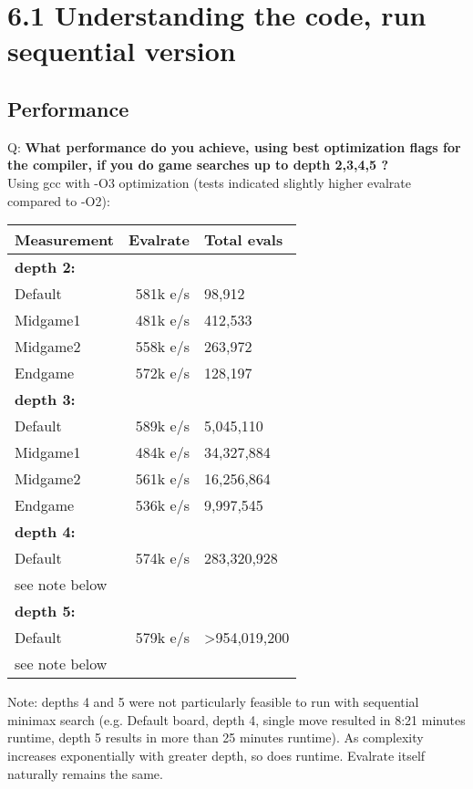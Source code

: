 \section*{6.1 Understanding the code, run sequential version}
\subsection*{Performance}
Q: \textbf{What performance do you achieve, using best optimization flags for the compiler, if you do game searches up to depth 2,3,4,5 ?} \\
Using gcc with -O3 optimization (tests indicated slightly higher evalrate compared to -O2): 
\begin{center}

  \begin{tabular} {|l|r|l|}
    \hline
    \textbf{Measurement} & \textbf{Evalrate} & \textbf{Total evals} \\ \hline
    \textbf{depth 2:} &  &  \\ \hline
    Default & 581k e/s & 98,912 \\ \hline
    Midgame1 & 481k e/s & 412,533 \\ \hline
    Midgame2 & 558k e/s & 263,972 \\ \hline
    Endgame & 572k e/s & 128,197 \\ \hline
    \textbf{depth 3:} &  &  \\ \hline
    Default & 589k e/s & 5,045,110 \\ \hline
    Midgame1 & 484k e/s & 34,327,884 \\ \hline
    Midgame2 & 561k e/s & 16,256,864 \\ \hline
    Endgame & 536k e/s & 9,997,545 \\ \hline
    \textbf{depth 4:} &  &  \\ \hline
    Default & 574k e/s & 283,320,928 \\ \hline
    see note below &  &  \\ \hline
    \textbf{depth 5:} &  &  \\ \hline
    Default & 579k e/s & \textgreater 954,019,200 \\ \hline
    see note below &  &  \\ \hline
  \end{tabular}

\end{center}
Note: depths 4 and 5 were not particularly feasible to run with sequential minimax search (e.g. Default board, depth 4, single move resulted in 8:21 minutes runtime, depth 5 results in more than 25 minutes runtime). As complexity increases exponentially with greater depth, so does runtime. Evalrate itself naturally remains the same.
